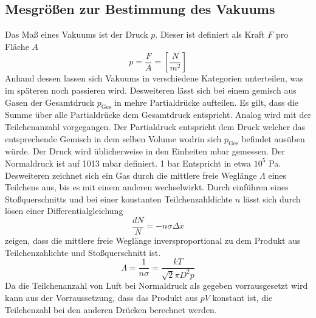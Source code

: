 \subsection{Mesgrößen zur Bestimmung des Vakuums}
Das Maß eines Vakuums ist der Druck $p$. Dieser ist definiert als Kraft $F$ pro Fläche $A$
\begin{equation}
  p = \frac{F}{A} = \left[ \frac{N}{m^2} \right]
  \label{eqn:druck}
\end{equation}
Anhand dessen lassen sich Vakuums in verschiedene Kategorien unterteilen, was im späteren noch passieren wird. Desweiteren lässt sich bei einem gemisch aus Gasen der Gesamtdruck $p_\text{Ges}$ in mehre Partialdrücke aufteilen. Es gilt, dass die Summe über alle Partialdrücke dem Gesamtdruck entspricht. Analog wird mit der Teilchenanzahl vorgegangen. Der Partialdruck entspricht dem Druck welcher das entsprechende Gemisch in dem selben Volume wodrin sich $p_\text{Ges}$ befindet ausüben würde. \newline
Der Druck wird üblicherweise in den Einheiten mbar gemessen. Der Normaldruck ist auf 1013 mbar definiert. 1 bar Entspricht in etwa $10^{5}$ Pa. \newline
Desweiteren zeichnet sich ein Gas durch die mittlere freie Weglänge $\Lambda$ eines Teilchens aus, bis es mit einem anderen wechselwirkt. Durch einführen eines Stoßquerschnitts und bei einer konstanten Teilchenzahldichte $n$ lässt sich durch lösen einer Differentialgleichung 
\begin{equation}
  \frac{dN}{N} = -n \sigma \Delta x
  \label{eqn:mfWDGL}
\end{equation}
zeigen, dass die mittlere freie Weglänge  inversproportional zu dem Produkt aus Teilchenzahlichte und Stoßquerschnitt ist.
\begin{equation}
  \Lambda = \frac{1}{n \sigma}= \frac{k T}{\sqrt{2} \pi D^2 p}
  \label{eqn:mfW}
\end{equation}
Da die Teilchenanzahl von Luft bei Normaldruck als gegeben vorrausgesetzt wird kann aus der Vorraussetzung, dass das Produkt aus $pV$ konstant ist, die Teilchenzahl bei den anderen Drücken berechnet werden. 
